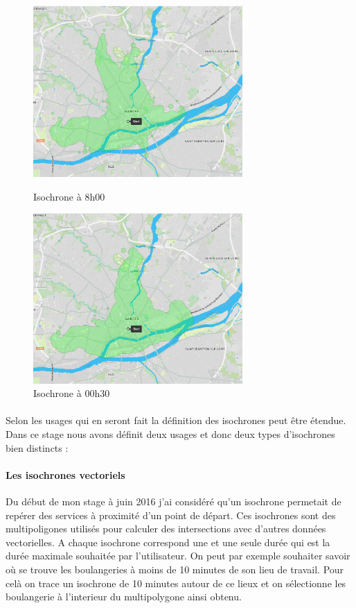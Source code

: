 \documentclass[a4paper]{report}
\begin{document}
\begin{figure}[H]
	\begin{minipage}[c]{.46\linewidth}
		\includegraphics[width=8cm]{image/iso_8h}
       		\caption{Isochrone à 8h00}
		\label{Isochrone à 8h00}
	\end{minipage} \hfill
	\begin{minipage}[c]{.46\linewidth}
		\includegraphics[width=8cm]{image/iso_00h30}
       		\caption{Isochrone à 00h30}
		\label{Isochrone à 00h30}
	\end{minipage}
\end{figure}

\paragraph{} Selon les usages qui en seront fait la définition des isochrones peut être étendue. Dans ce stage nous avons définit deux usages et donc deux types d'isochrones bien distincts : 

\paragraph{Les isochrones vectoriels} Du début de mon stage à juin 2016 j'ai considéré qu'un isochrone permetait de repérer des services à proximité d'un point de départ. Ces isochrones sont des multipoligones utilisés pour calculer des intersections avec d'autres données vectorielles. A chaque isochrone correspond une et une seule durée qui est la durée maximale souhaitée par l'utilisateur. On peut par exemple souhaiter savoir où se trouve les boulangeries à moins de 10 minutes de son lieu de travail. Pour celà on trace un isochrone de 10 minutes autour de ce lieux et on sélectionne les boulangerie à l'interieur du multipolygone ainsi obtenu.
\end{document}
